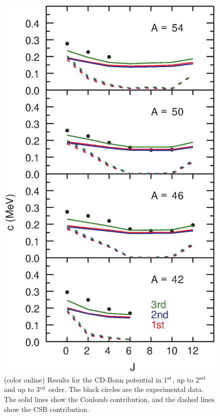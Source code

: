 \documentclass[
10pt,
showpacs,preprintnumbers,footinbib,
amsmath,amssymb,
aps,
prl,twocolumn,groupedaddress,superscriptaddress,
showkeys
]{revtex4-1}
\begin{document}
\begin{figure}
\includegraphics[scale=0.35]{ccd.eps}
\caption{(color online) Results for the CD-Bonn potential
in 1$^{\rm st}$, up to 2$^{\rm nd}$ and up to 3$^{\rm rd}$ order.
The black circles
are the experimental data. The solid lines show the Coulomb
contribution, and the dashed lines show the CSB contribution.}
\end{figure}
\end{document}
